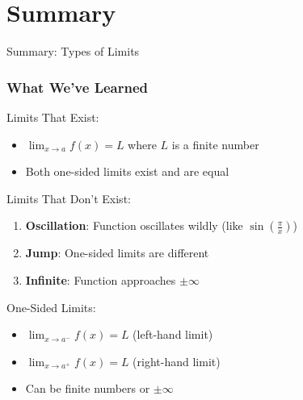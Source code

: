 \documentclass[aspectratio=169]{beamer}
\newcommand{\limxa}[1]{\lim_{x \to a} #1}
\newcommand{\limxap}[1]{\lim_{x \to a^+} #1}
\newcommand{\limxam}[1]{\lim_{x \to a^-} #1}
\begin{document}
\section{Summary}

\begin{frame}{Summary: Types of Limits}
\frametitle{What We've Learned}

\begin{block}{Limits That Exist:}
\begin{itemize}
\item $\limxa{f(x)} = L$ where $L$ is a finite number
\item Both one-sided limits exist and are equal
\end{itemize}
\end{block}

\begin{block}{Limits That Don't Exist:}
\begin{enumerate}
\item \textbf{Oscillation}: Function oscillates wildly (like $\sin(\frac{\pi}{x})$)
\item \textbf{Jump}: One-sided limits are different
\item \textbf{Infinite}: Function approaches $\pm\infty$
\end{enumerate}
\end{block}

\begin{block}{One-Sided Limits:}
\begin{itemize}
\item $\limxam{f(x)} = L$ (left-hand limit)
\item $\limxap{f(x)} = L$ (right-hand limit)
\item Can be finite numbers or $\pm\infty$
\end{itemize}
\end{block}

\end{frame}
\end{document}
